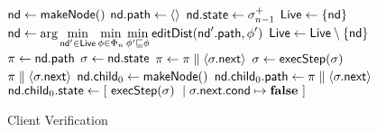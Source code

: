 \clearpage
\begin{figure}[h]
\begin{minipage}{\textwidth}
\begin{algorithm}[H] %
\caption{Client Verification}
\begin{algorithmic}[1]
  \State $\mathsf{nd} \gets \mathsf{makeNode}()$
  \label{fig:verifyAlg:makeRoot}
  \State $\mathsf{nd}.\mathsf{path} \gets \langle\rangle$
  \State $\mathsf{nd}.\mathsf{state} \gets \sigma^{+}_{n-1}$
  \label{fig:verifyAlg:initRoot}
  \State $\mathsf{Live} \gets \{\mathsf{nd}\}$
  \label{fig:verifyAlg:initLiveSet}
    \label{fig:verifyAlg:mainWhile}
    \State $\displaystyle \node \gets \arg \min_{\nodeAlt \in \liveSet} \min_{\trainingFrag \in \trainingFrags{\msgNmbr}} \min_{\trainingFragAlt \prefixOf \trainingFrag} \Call{\editDist}{\nodeAlt.\pathField, \trainingFragAlt}$
    \label{fig:verifyAlg:editDist}
    \State $\mathsf{Live} \gets \mathsf{Live} \setminus \{\mathsf{nd}\}$
    \label{fig:verifyAlg:removeFromLiveSet}
    \State $\pi \gets \mathsf{nd}.\mathsf{path}$
    \State $\sigma \gets \mathsf{nd}.\mathsf{state}$ 
    \label{fig:verifyAlg:initNewState}
    \label{fig:verifyAlg:execWhile}
      \State $\pi \gets \pi \parallel \langle \sigma.\mathsf{next} \rangle$
      \State $\newState \gets \Call{\execStep}{\newState}$
      \label{fig:verifyAlg:execStep}
    \EndWhile
      \label{fig:verifyAlg:isIOInstruction}
      \State \Return $\pi \parallel \langle \sigma.\mathsf{next} \rangle$
      \label{fig:verifyAlg:returnSuccess}
      \EndIf
    \label{fig:verifyAlg:isSymbolicBranch}
      \State $\mathsf{nd}.\mathsf{child}_{0} \gets \mathsf{makeNode}()$
      \label{fig:verifyAlg:makeChildFalse}
      \State $\mathsf{nd}.\mathsf{child}_{0}.\mathsf{path} \gets \pi \parallel \langle \sigma.\mathsf{next} \rangle$
      \State $\node.\childField{0}.\stateField \gets [~\Call{\execStep}{\newState}~\mid \newState.\nextInstruction.\condition \mapsto \codeFalse~]$ \\

\end{algorithmic}
\end{algorithm}
\end{minipage}
\end{figure}
